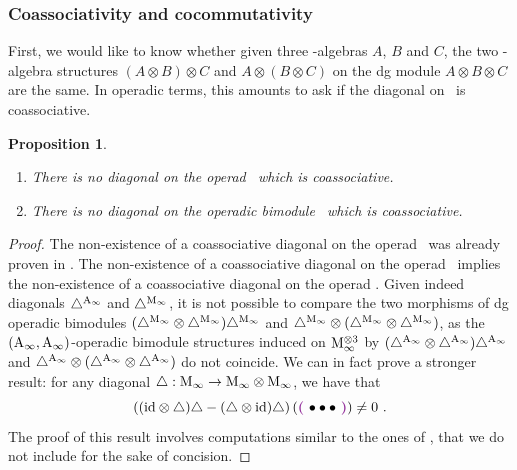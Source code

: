\documentclass[twoside, 11pt]{amsart}
\newtheorem{proposition}[definition]{Proposition}
\theoremstyle{remark}
\begin{document}
\subsubsection{Coassociativity and cocommutativity} \label{sss:coassoc-cocomm}

First, we would like to know whether given three \Ainf -algebras $A$, $B$ and $C$, the two \Ainf -algebra structures $( A \otimes B) \otimes C$ and $A \otimes ( B \otimes C)$ on the dg module $A \otimes B \otimes C$ are the same. 
In operadic terms, this amounts to ask if the diagonal on \Ainf\ is coassociative.

\begin{proposition} $ $
  \label{prop:nocoassoc}
  \begin{enumerate}[leftmargin=*]
  \item There is no diagonal on the operad \Ainf\ which is coassociative. 
  \item There is no diagonal on the operadic bimodule \Minf\ which is coassociative.
  \end{enumerate}
\end{proposition} 

\begin{proof}
The non-existence of a coassociative diagonal on the operad \Ainf\ was already proven in \cite[Section 6]{MarklShnider06}.
The non-existence of a coassociative diagonal on the operad \Ainf\ implies the non-existence of a coassociative diagonal on the operad \Minf . 
Given indeed diagonals $\triangle^{\mathrm{A}_\infty}$ and $\triangle^{\mathrm{M}_\infty}$, it is not possible to compare the two morphisms of dg operadic bimodules $ ( \triangle^{\mathrm{M}_\infty} \otimes \triangle^{\mathrm{M}_\infty} ) \triangle^{\mathrm{M}_\infty}$ and $\triangle^{\mathrm{M}_\infty} \otimes (\triangle^{\mathrm{M}_\infty} \otimes \triangle^{\mathrm{M}_\infty} )$, as the $(\mathrm{A}_\infty , \mathrm{A}_\infty)$-operadic bimodule structures induced on $\mathrm{M}_\infty^{\otimes 3}$ by $ ( \triangle^{\mathrm{A}_\infty} \otimes \triangle^{\mathrm{A}_\infty} ) \triangle^{\mathrm{A}_\infty}$ and $\triangle^{\mathrm{A}_\infty} \otimes (\triangle^{\mathrm{A}_\infty} \otimes \triangle^{\mathrm{A}_\infty} )$ do not coincide.
We can in fact prove a stronger result:  for any diagonal $\triangle : \mathrm{M}_\infty \to \mathrm{M}_\infty \otimes \mathrm{M}_\infty$, we have that
\[ \left( (\ide \otimes \triangle ) \triangle - (\triangle \otimes \ide) \triangle \right) \left( \purple{\bullet \bullet \bullet} \right) \neq 0 \ . \]
The proof of this result involves computations similar to the ones of \cite[Section 6]{MarklShnider06}, that we do not include for the sake of concision. 
\end{proof}
\end{document}
